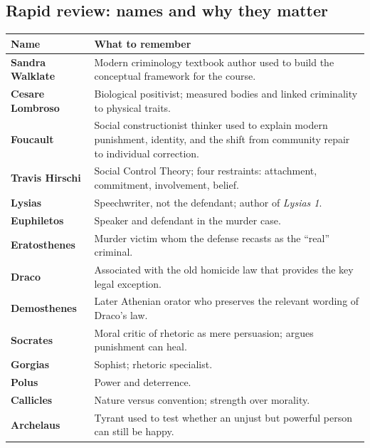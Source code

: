 \documentclass[11pt]{article}
\begin{document}
\subsection*{Rapid review: names and why they matter}

\begin{tabularx}{\linewidth}{@{}lX@{}}
\toprule
\textbf{Name} & \textbf{What to remember} \\
\midrule
\textbf{Sandra Walklate} & Modern criminology textbook author used to build the conceptual framework for the course. \\
\textbf{Cesare Lombroso} & Biological positivist; measured bodies and linked criminality to physical traits. \\
\textbf{Foucault} & Social constructionist thinker used to explain modern punishment, identity, and the shift from community repair to individual correction. \\
\textbf{Travis Hirschi} & Social Control Theory; four restraints: attachment, commitment, involvement, belief. \\
\textbf{Lysias} & Speechwriter, not the defendant; author of \textit{Lysias 1}. \\
\textbf{Euphiletos} & Speaker and defendant in the murder case. \\
\textbf{Eratosthenes} & Murder victim whom the defense recasts as the ``real'' criminal. \\
\textbf{Draco} & Associated with the old homicide law that provides the key legal exception. \\
\textbf{Demosthenes} & Later Athenian orator who preserves the relevant wording of Draco's law. \\
\textbf{Socrates} & Moral critic of rhetoric as mere persuasion; argues punishment can heal. \\
\textbf{Gorgias} & Sophist; rhetoric specialist. \\
\textbf{Polus} & Power and deterrence. \\
\textbf{Callicles} & Nature versus convention; strength over morality. \\
\textbf{Archelaus} & Tyrant used to test whether an unjust but powerful person can still be happy. \\
\bottomrule
\end{tabularx}
\end{document}
